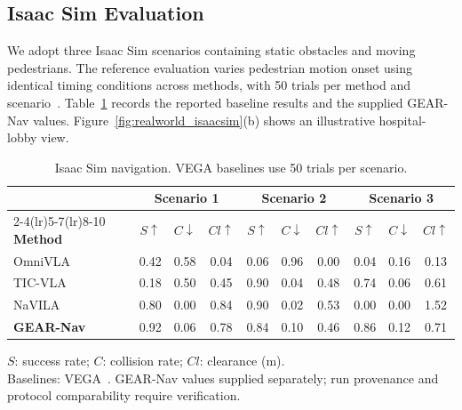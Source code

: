\documentclass[letterpaper, 10 pt, conference]{ieeeconf}  %
\begin{document}
\subsection{Isaac Sim Evaluation}
\label{sec:simulation}

We adopt three Isaac Sim scenarios containing static obstacles and moving
pedestrians. The reference evaluation varies pedestrian motion onset using
identical timing conditions across methods, with 50 trials per method and
scenario~\cite{vega}. Table~\ref{tab:isaac_sim} records the reported baseline
results and the supplied GEAR-Nav values.
Figure~\ref{fig:realworld_isaacsim}(b) shows an illustrative hospital-lobby
view.

\begin{table}[!tb]
\centering
\caption{Isaac Sim navigation. VEGA baselines use 50 trials per scenario.}
\label{tab:isaac_sim}
\footnotesize
\setlength{\tabcolsep}{2pt}
\renewcommand{\arraystretch}{1.08}
\begin{tabular*}{\columnwidth}{@{\extracolsep{\fill}}lccc@{\hspace{7pt}}ccc@{\hspace{7pt}}ccc@{}}
\toprule
& \multicolumn{3}{c}{\textbf{Scenario 1}}
& \multicolumn{3}{c}{\textbf{Scenario 2}}
& \multicolumn{3}{c}{\textbf{Scenario 3}} \\
\cmidrule(lr){2-4}\cmidrule(lr){5-7}\cmidrule(lr){8-10}
\textbf{Method}
& $S\uparrow$ & $C\downarrow$ & $Cl\uparrow$
& $S\uparrow$ & $C\downarrow$ & $Cl\uparrow$
& $S\uparrow$ & $C\downarrow$ & $Cl\uparrow$ \\
\midrule
OmniVLA
& 0.42 & 0.58 & 0.04
& 0.06 & 0.96 & 0.00
& 0.04 & 0.16 & 0.13 \\
TIC-VLA
& 0.18 & 0.50 & 0.45
& 0.90 & 0.04 & 0.48
& 0.74 & 0.06 & 0.61 \\
NaVILA
& 0.80 & 0.00 & 0.84
& 0.90 & 0.02 & 0.53
& 0.00 & 0.00 & 1.52 \\
\midrule
\textbf{GEAR-Nav}
& 0.92 & 0.06 & 0.78
& 0.84 & 0.10 & 0.46
& 0.86 & 0.12 & 0.71 \\
\bottomrule
\end{tabular*}
\par\vspace{2pt}
\parbox{\columnwidth}{\scriptsize\raggedright
$S$: success rate; $C$: collision rate; $Cl$: clearance (m).\\
Baselines: VEGA~\cite{vega}. GEAR-Nav values supplied separately; run provenance and protocol comparability require verification.}
\end{table}
\end{document}
